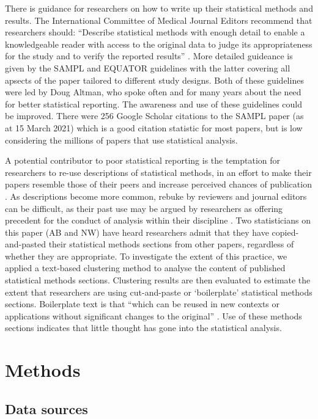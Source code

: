 \documentclass[12pt]{article}
\begin{document}
There is guidance for researchers on how to write up their statistical
methods and results. The International Committee of Medical Journal
Editors recommend that researchers should: ``Describe statistical
methods with enough detail to enable a knowledgeable reader with access
to the original data to judge its appropriateness for the study and to
verify the reported results'' \citep{ICMJE2019}. More detailed guideance
is given by the SAMPL and EQUATOR guidelines
\citep{Lang2013, Altman2016} with the latter covering all apsects of the
paper tailored to different study designs. Both of these guidelines were led by Doug Altman, who spoke often
and for many years about the need for better statistical reporting. The
awareness and use of these guidelines could be improved. There were 256
Google Scholar citations to the SAMPL paper (as at 15 March 2021) which
is a good citation statistic for most papers, but is low considering the
millions of papers that use statistical analysis.

A potential contributor to poor statistical reporting is the temptation for researchers to re-use
descriptions of statistical methods, in an effort to make their papers resemble those of their peers 
and increase perceived chances of publication  \citep{Diong2018}. As descriptions become more common, rebuke by 
reviewers and journal editors can be difficult, as their past use may be argued by researchers as offering precedent for the 
conduct of analysis within their discipline \citep{Altman2002}. Two statisticians on this paper 
(AB and NW) have heard researchers admit
that they have copied-and-pasted their statistical methods sections from
other papers, regardless of whether they are appropriate. To investigate the extent of this practice, we applied a text-based 
clustering method to analyse the content of published statistical methods sections.
Clustering results are then evaluated to estimate the extent that researchers are
using cut-and-paste or `boilerplate' statistical methods sections.
Boilerplate text is that ``which can be reused in new contexts or
applications without significant changes to the original''
\citep{Wikipedia}. Use of these methods sections indicates that little
thought has gone into the statistical analysis.

\hypertarget{methods}{%
\section{Methods}\label{methods}}

\subsection{Data sources}
\end{document}
